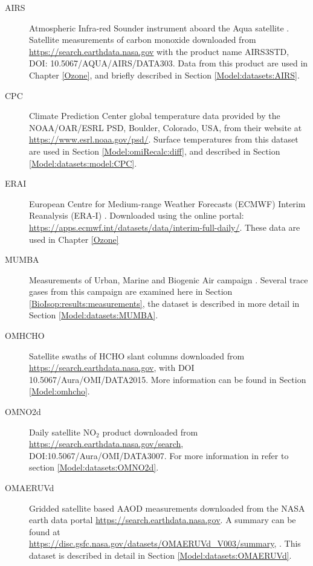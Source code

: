   \begin{description}
    \item[AIRS] Atmospheric Infra-red Sounder instrument aboard the Aqua satellite \parencite{AIRS3STD}.
    Satellite measurements of carbon monoxide downloaded from \url{https://search.earthdata.nasa.gov} with the product name AIRS3STD, DOI: 10.5067/AQUA/AIRS/DATA303.
    Data from this product are used in Chapter \ref{Ozone}, and briefly described in Section \ref{Model:datasets:AIRS}.
    
    \item[CPC] Climate Prediction Center global temperature data provided by the NOAA/OAR/ESRL PSD, Boulder, Colorado, USA, from their website at \url{https://www.esrl.noaa.gov/psd/}.
    Surface temperatures from this dataset are used in Section \ref{Model:omiRecalc:diff}, and described in Section \ref{Model:datasets:model:CPC}.
    
    \item[ERAI] European Centre for Medium-range Weather Forecasts (ECMWF) Interim Reanalysis (ERA-I) \parencite{Dee2011}. 
    Downloaded using the online portal: \url{https://apps.ecmwf.int/datasets/data/interim-full-daily/}.
    These data are used in Chapter \ref{Ozone}
    
    \item[MUMBA] Measurements of Urban, Marine and Biogenic Air campaign \parencite{PatonWalsh2017}.
    Several trace gases from this campaign are examined here in Section \ref{BioIsop:results:measurements}, the dataset is described in more detail in Section \ref{Model:datasets:MUMBA}.
    
    
    \item[OMHCHO] Satellite swaths of HCHO slant columns downloaded from \url{https://search.earthdata.nasa.gov}, with DOI 10.5067/Aura/OMI/DATA2015.
    More information can be found in Section \ref{Model:omhcho}.
    
    \item[OMNO2d] Daily satellite NO$_2$ product downloaded from \url{https://search.earthdata.nasa.gov/search}, DOI:10.5067/Aura/OMI/DATA3007. 
    For more information in refer to section \ref{Model:datasets:OMNO2d}.
    
    \item[OMAERUVd] Gridded satellite based AAOD measurements downloaded from the NASA earth data portal \url{https://search.earthdata.nasa.gov}.
    A summary can be found at \url{https://disc.gsfc.nasa.gov/datasets/OMAERUVd\_V003/summary}, .
    This dataset is described in detail in Section \ref{Model:datasets:OMAERUVd}.
    

\end{description}
